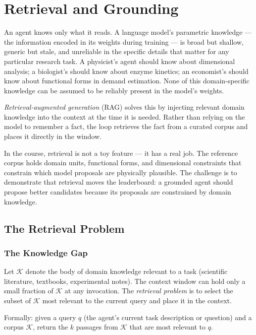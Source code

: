 \chapter{Retrieval and Grounding}
\label{chapter:Retrieval}

An agent knows only what it reads.
A language model's parametric knowledge — the information encoded in its weights during training — is broad but shallow, generic but stale, and unreliable in the specific details that matter for any particular research task.
A physicist's agent should know about dimensional analysis; a biologist's should know about enzyme kinetics; an economist's should know about functional forms in demand estimation.
None of this domain-specific knowledge can be assumed to be reliably present in the model's weights.

\emph{Retrieval-augmented generation} (RAG) solves this by injecting relevant domain knowledge into the context at the time it is needed.
Rather than relying on the model to remember a fact, the loop retrieves the fact from a curated corpus and places it directly in the window.

In the course, retrieval is not a toy feature — it has a real job.
The reference corpus holds domain units, functional forms, and dimensional constraints that constrain which model proposals are physically plausible.
The challenge is to demonstrate that retrieval moves the leaderboard: a grounded agent should propose better candidates because its proposals are constrained by domain knowledge.

\section{The Retrieval Problem}
\label{section:RetrievalProblem}

\subsection{The Knowledge Gap}

Let $\mathcal{K}$ denote the body of domain knowledge relevant to a task (scientific literature, textbooks, experimental notes).
The context window can hold only a small fraction of $\mathcal{K}$ at any invocation.
The \emph{retrieval problem} is to select the subset of $\mathcal{K}$ most relevant to the current query and place it in the context.

Formally: given a query $q$ (the agent's current task description or question) and a corpus $\mathcal{K}$, return the $k$ passages from $\mathcal{K}$ that are most relevant to $q$.

